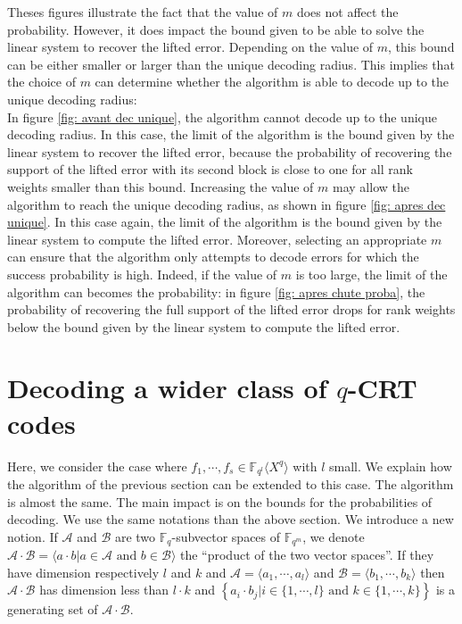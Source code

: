 \documentclass{article}
\newcommand{\nobracket}{}
\theoremstyle{definition}
\begin{document}
Theses figures illustrate the fact that the value of $m$ does not affect the probability. However, it does impact the bound given to be able to solve the linear system to recover the lifted error. Depending on the value of $m$, this bound can be either smaller or larger than the unique decoding radius. This implies that the choice of $m$ can determine whether the algorithm is able to decode up to the unique decoding radius: \\
In figure \ref{fig: avant dec unique}, the algorithm cannot decode up to the unique decoding radius. In this case, the limit of the algorithm is the bound given by the linear system to recover the lifted error, because the probability of recovering the support of the lifted error with its second block is close to one for all rank weights smaller than this bound.  Increasing the value of $m$ may allow the algorithm to reach the unique decoding radius, as shown in figure \ref{fig: apres dec unique}. In this case again, the limit of the algorithm is the bound given by the linear system to compute the lifted error. Moreover, selecting an appropriate $m$ can ensure that the algorithm only attempts to decode errors for which the success probability is high. Indeed, if the value of $m$ is too large, the limit of the algorithm can becomes the probability: in figure \ref{fig: apres chute proba}, the probability of recovering the full support of the lifted error drops for rank weights below the bound given by the linear system to compute the lifted error.

\section{Decoding a wider class of $q$-CRT codes} \label{widerdecod}

Here, we consider the case where $f_1, \cdots, f_s \in \mathbb{F}_{q^l}
      \langle X^q \rangle$ with $l$ small. We explain how the algorithm of the
previous section can be extended to this case. The algorithm is almost the
same. The main impact is on the bounds for the probabilities of decoding. We
use the same notations than the above section. We introduce a new notion. If
$\mathcal{A}$ and $\mathcal{B}$ are two $\mathbb{F}_q$-subvector spaces of
$\mathbb{F}_{q^m}$, we denote $\mathcal{A} \cdot \mathcal{B}= \langle a \cdot
      b | a \in \mathcal{A} \text{ and } b \in \mathcal{B} \rangle \nobracket$ the
``product of the two vector spaces''. If they have dimension respectively $l$
and $k$ and $\mathcal{A}= \langle a_1, \cdots, a_l \rangle$ and $\mathcal{B}=
      \langle b_1, \cdots, b_k \rangle$ then $\mathcal{A} \cdot \mathcal{B}$ has
dimension less than $l \cdot k$ and $\left\{ a_i \cdot b_j | \nobracket i \in
      \{ 1, \cdots, l \}\text{ and } k \in \{ 1, \cdots, k
      \} \right\}$ is a generating set of $\mathcal{A} \cdot \mathcal{B}$. \
\end{document}
